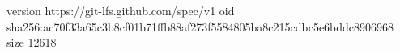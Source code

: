 version https://git-lfs.github.com/spec/v1
oid sha256:ac70f33a65c3b8cf01b71ffb88af273f5584805ba8c215cdbc5e6bddc8906968
size 12618
